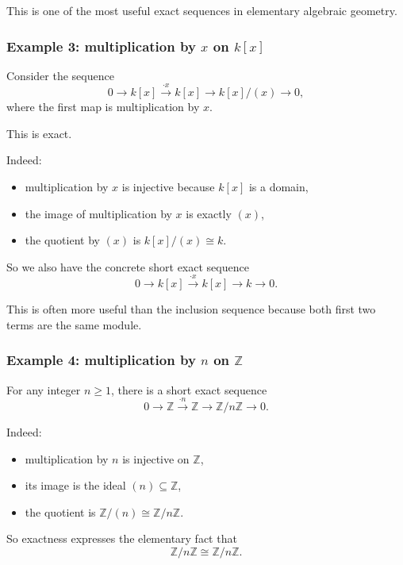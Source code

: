 \documentclass[12pt,a4paper]{article}
\theoremstyle{notespace}
\theoremstyle{definition}
\begin{document}
This is one of the most useful exact sequences in elementary algebraic geometry.

\subsubsection{Example 3: multiplication by \(x\) on \(k[x]\)}

Consider the sequence
\[
0 \longrightarrow k[x] \xrightarrow{\cdot x} k[x] \longrightarrow k[x]/(x) \longrightarrow 0,
\]
where the first map is multiplication by \(x\).

This is exact.

Indeed:

\begin{itemize}
	\item multiplication by \(x\) is injective because \(k[x]\) is a domain,
	\item the image of multiplication by \(x\) is exactly \((x)\),
	\item the quotient by \((x)\) is \(k[x]/(x)\cong k\).
\end{itemize}

So we also have the concrete short exact sequence
\[
0 \longrightarrow k[x] \xrightarrow{\cdot x} k[x] \longrightarrow k \longrightarrow 0.
\]

This is often more useful than the inclusion sequence because both first two terms are the same module.

\subsubsection{Example 4: multiplication by \(n\) on \(\mathbb Z\)}

For any integer \(n\geq 1\), there is a short exact sequence
\[
0 \longrightarrow \mathbb Z \xrightarrow{\cdot n} \mathbb Z \longrightarrow \mathbb Z/n\mathbb Z \longrightarrow 0.
\]

Indeed:

\begin{itemize}
	\item multiplication by \(n\) is injective on \(\mathbb Z\),
	\item its image is the ideal \((n)\subseteq \mathbb Z\),
	\item the quotient is \(\mathbb Z/(n)\cong \mathbb Z/n\mathbb Z\).
\end{itemize}

So exactness expresses the elementary fact that
\[
\mathbb Z/n\mathbb Z \cong \mathbb Z / n\mathbb Z.
\]
\end{document}
